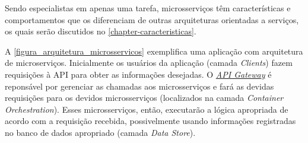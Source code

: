 Sendo especialistas em apenas uma tarefa, microsserviços têm características e comportamentos que os diferenciam de outras arquiteturas orientadas a serviços, os quais serão discutidos no \autoref{chapter-caracteristicas}.

A \autoref{figura_arquitetura_microsservicos} exemplifica uma aplicação com arquitetura de microserviços. Inicialmente os usuários da aplicação (camada \emph{Clients}) fazem requisições à API para obter as informações desejadas. O \hyperref[boas-praticas-api-gateway]{\emph{API Gateway}} é reponsável por gerenciar as chamadas aos microsserviços e fará as devidas requisições para os devidos microsserviços (localizados na camada \emph{Container Orchestration}). Esses microsserviços, então, executarão a lógica apropriada de acordo com a requisição recebida, possivelmente usando informações registradas no banco de dados apropriado (camada \emph{Data Store}).




